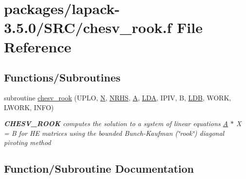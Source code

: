 \hypertarget{chesv__rook_8f}{}\section{packages/lapack-\/3.5.0/\+S\+R\+C/chesv\+\_\+rook.f File Reference}
\label{chesv__rook_8f}
\subsection*{Functions/\+Subroutines}
\begin{DoxyCompactItemize}
\item 
subroutine \hyperlink{chesv__rook_8f_add4a16ebf529a752be16e40daf0c624b}{chesv\+\_\+rook} (U\+P\+L\+O, \hyperlink{polmisc_8c_a0240ac851181b84ac374872dc5434ee4}{N}, \hyperlink{example__user_8c_aa0138da002ce2a90360df2f521eb3198}{N\+R\+H\+S}, \hyperlink{classA}{A}, \hyperlink{example__user_8c_ae946da542ce0db94dced19b2ecefd1aa}{L\+D\+A}, I\+P\+I\+V, B, \hyperlink{example__user_8c_a50e90a7104df172b5a89a06c47fcca04}{L\+D\+B}, W\+O\+R\+K, L\+W\+O\+R\+K, I\+N\+F\+O)
\begin{DoxyCompactList}\small\item\em {\bfseries C\+H\+E\+S\+V\+\_\+\+R\+O\+O\+K} computes the solution to a system of linear equations \hyperlink{classA}{A} $\ast$ X = B for H\+E matrices using the bounded Bunch-\/\+Kaufman (\char`\"{}rook\char`\"{}) diagonal pivoting method \end{DoxyCompactList}\end{DoxyCompactItemize}


\subsection{Function/\+Subroutine Documentation}
\hypertarget{chesv__rook_8f_add4a16ebf529a752be16e40daf0c624b}{}
